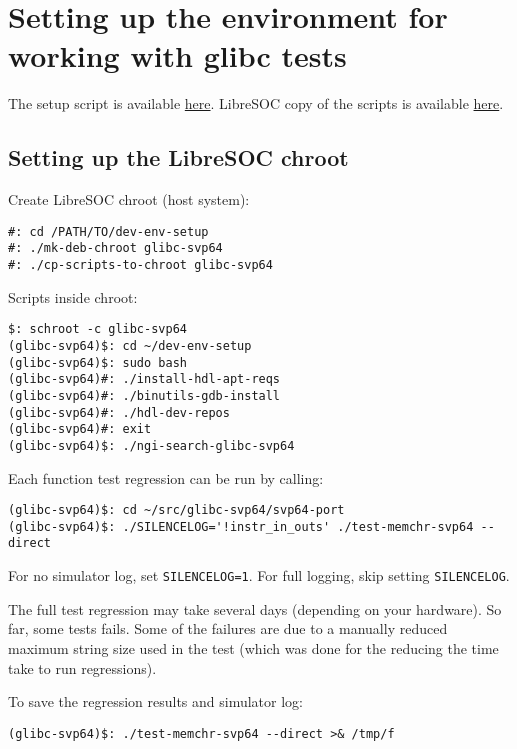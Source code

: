 \section{Setting up the environment for working with glibc tests}

The setup script is available
\href{https://git.vantosh.com/ngisearch/documentation/src/branch/master/shell-scripts}{here}.
LibreSOC copy of the scripts is available
\href{https://git.libre-soc.org/?p=dev-env-setup.git;a=tree}{here}.

\subsection{Setting up the LibreSOC chroot}

Create LibreSOC chroot (host system):

\begin{verbatim}
#: cd /PATH/TO/dev-env-setup
#: ./mk-deb-chroot glibc-svp64
#: ./cp-scripts-to-chroot glibc-svp64
\end{verbatim}

Scripts inside chroot:

\begin{verbatim}
$: schroot -c glibc-svp64
(glibc-svp64)$: cd ~/dev-env-setup
(glibc-svp64)$: sudo bash
(glibc-svp64)#: ./install-hdl-apt-reqs
(glibc-svp64)#: ./binutils-gdb-install
(glibc-svp64)#: ./hdl-dev-repos
(glibc-svp64)#: exit
(glibc-svp64)$: ./ngi-search-glibc-svp64
\end{verbatim}

Each function test regression can be run by calling:

\begin{verbatim}
(glibc-svp64)$: cd ~/src/glibc-svp64/svp64-port
(glibc-svp64)$: ./SILENCELOG='!instr_in_outs' ./test-memchr-svp64 --direct
\end{verbatim}

For no simulator log, set \texttt{SILENCELOG=1}.
For full logging, skip setting \texttt{SILENCELOG}.

The full test regression may take several days (depending on your hardware).
So far, some tests fails. Some of the failures are due to a manually reduced
maximum string size used in the test (which was done for the reducing the time
take to run regressions).

To save the regression results and simulator log:

\begin{verbatim}
(glibc-svp64)$: ./test-memchr-svp64 --direct >& /tmp/f
\end{verbatim}

